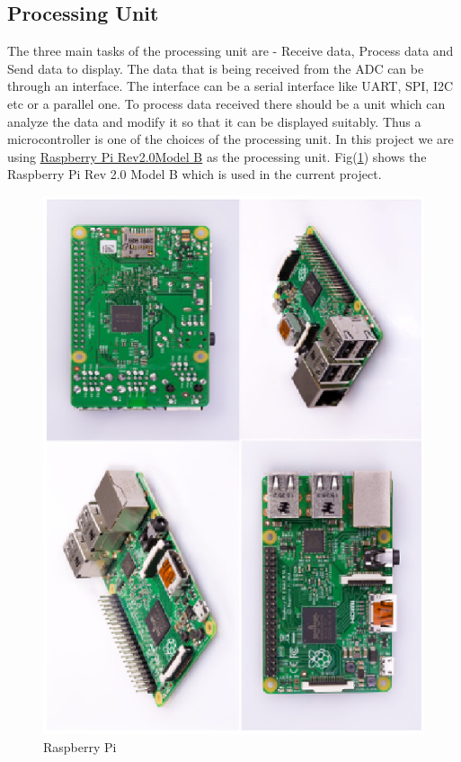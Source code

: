 \documentclass[12pt, a4paper, twoside]{article}
\begin{document}
\subsection{Processing Unit}
    The three main tasks of the processing unit are - Receive data, Process data and Send data to display. The data that is being received from the ADC can be through an interface. The interface can be a serial interface like UART, SPI, I2C etc or a parallel one. To process data received there should be a unit which can analyze the data and modify it so that it can be displayed suitably. Thus a microcontroller is one of the choices of the processing unit. In this project we are using \href{https://www.raspberrypi.org/}{Raspberry Pi Rev2.0Model B}\cite{bib_raspberrypi} as the processing unit. Fig(\ref{fig_rpi}) shows the Raspberry Pi Rev 2.0 Model B which is used in the current project.
 
\begin{figure}[ht]
    \centering
    \includegraphics[scale=0.75]{rpi.ps}
    \caption{Raspberry Pi}
    \label{fig_rpi}
\end{figure}
\end{document}
